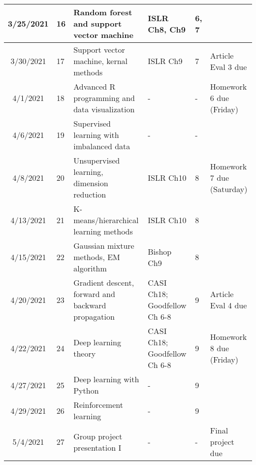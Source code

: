 \documentclass[11pt]{article}
\begin{document}
\begin{center}
\begin{tabular}{c|m{3em}|m{21em}|m{7em}|m{3em}|m{8em}}
3/25/2021 & 16 & Random forest and support vector machine & ISLR Ch8, Ch9 &  6, 7 &  \\ \hline
3/30/2021 & 17 & Support vector machine, kernal methods & ISLR Ch9 & 7 & Article Eval 3 due\\ \hline
4/1/2021 & 18 & Advanced R programming and data visualization & - & - & Homework 6 due (Friday)\\ \hline
4/6/2021 & 19 & Supervised learning with imbalanced data & - & - & \\ \hline
4/8/2021 & 20 & Unsupervised learning, dimension reduction & ISLR Ch10 & 8 & Homework 7 due (Saturday)\\ \hline
4/13/2021 & 21 & K-means/hierarchical learning methods & ISLR Ch10 & 8 &\\ \hline
4/15/2021 & 22 & Gaussian mixture methods, EM algorithm & Bishop Ch9 & 8 & \\ \hline
4/20/2021 & 23 & Gradient descent, forward and backward propagation & CASI Ch18; Goodfellow Ch 6-8 & 9 & Article Eval 4 due\\ \hline
4/22/2021 & 24 & Deep learning theory & CASI Ch18; Goodfellow Ch 6-8 & 9 & Homework 8 due (Friday)\\ \hline
4/27/2021 & 25 & Deep learning with Python & - & 9 & \\ \hline
4/29/2021 & 26 & Reinforcement learning & - & 9 & \\ \hline
5/4/2021 & 27 & Group project presentation I & - & - & Final project due
\end{tabular}
\end{center}
\end{document}
